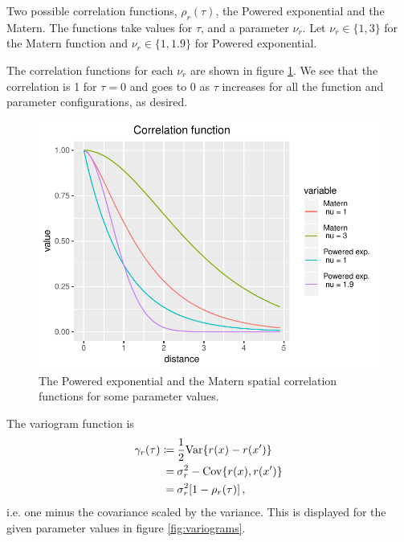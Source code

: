 Two possible correlation functions, $\rho_r(\tau)$, the Powered exponential and the Matern. The functions take values for $\tau$, and a parameter $\nu_r$. Let $\nu_r \in \{1,3\}$ for the Matern function and $\nu_r \in \{1,1.9\}$ for Powered exponential. 

The correlation functions for each $\nu_r$ are shown in figure \ref{fig:corrfunc}. We see that the correlation is 1 for $\tau = 0$ and goes to 0 as $\tau$ increases for all the function and parameter configurations, as desired.

\begin{figure}
    \centering
    \includegraphics{figures/corrfunc.pdf}
    \caption{The Powered exponential and the Matern spatial correlation functions for some parameter values.}
    \label{fig:corrfunc}
\end{figure}

The variogram function is
%
\begin{align*}
\gamma_r(\tau)
\coloneqq&\: \frac{1}{2} \mathrm{Var} \{ r(x) - r(x') \} \\
=&\: \sigma_r^2 - \mathrm{Cov}\{r(x), r(x')\} \\
=&\: \sigma_r^2[1 - \rho_r(\tau)] \, ,
\end{align*}
%
i.e. one minus the covariance scaled by the variance. This is displayed for the given parameter values in figure \ref{fig:variograms}.

